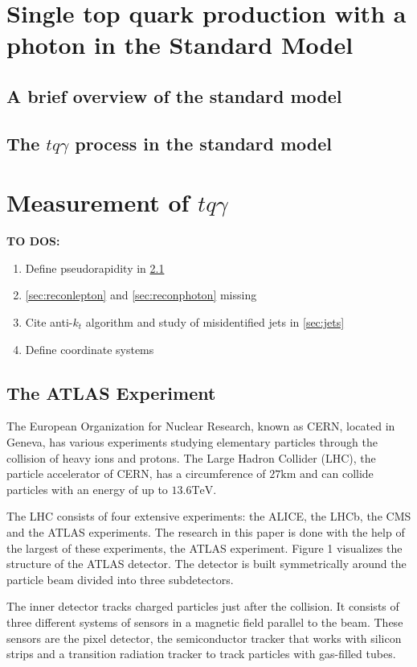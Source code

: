 \chapter{Single top quark production with a photon in the Standard Model}
\section{A brief overview of the standard model}
\section{The \texorpdfstring{$tq\gamma$}{tqGamma} process in the standard model}


\chapter{Measurement of \texorpdfstring{$tq\gamma$}{tqGamma}}
\textbf{TO DOS:}
\begin{enumerate}
    \item Define pseudorapidity in \ref{sec:atlas}
    \item \ref{sec:reconlepton} and \ref{sec:reconphoton} missing
    \item Cite anti-$k_t$ algorithm and study of misidentified jets in \ref{sec:jets}
    \item Define coordinate systems
\end{enumerate}


\section{The ATLAS Experiment}
\label{sec:atlas}
The European Organization for Nuclear Research, known as CERN, located in Geneva, has various experiments studying elementary particles through the collision of heavy ions and protons. 
The Large Hadron Collider (LHC), the particle accelerator of CERN, has a circumference of $27 \si{\kilo\metre}$ and can collide particles with an energy of up to $13.6 \si{\tera\electronvolt}$. 


The LHC consists of four extensive experiments: the ALICE, the LHCb, the CMS and the ATLAS experiments. The research in this paper is done with the help of the largest of these experiments, the ATLAS experiment. Figure 1 visualizes the structure of the ATLAS detector.  The detector is built symmetrically around the particle beam divided into three subdetectors.

The inner detector tracks charged particles just after the collision. It consists of three different systems of sensors in a magnetic field parallel to the beam. These sensors are the pixel detector, the semiconductor tracker that works with silicon strips and a transition radiation tracker to track particles with gas-filled tubes. 


